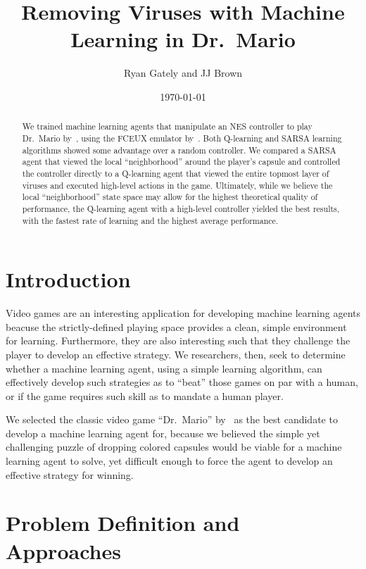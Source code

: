 \documentclass[letterpaper]{article} %
\author{Ryan Gately and JJ Brown}
\date{\today}
\title{Removing Viruses with Machine Learning in Dr.~Mario}
\begin{document}
\maketitle

\begin{abstract}
We trained machine learning agents that manipulate an NES controller to play Dr.~Mario by~\cite{drmario90}, using the FCEUX emulator by~\cite{fceux18}.
Both Q-learning and SARSA learning algorithms showed some advantage over a random controller.
We compared a SARSA agent that viewed the local ``neighborhood'' around the player's capsule and controlled the controller directly to a Q-learning agent that viewed the entire topmost layer of viruses and executed high-level actions in the game. Ultimately, while we believe the local ``neighborhood'' state space may allow for the highest theoretical quality of performance, the Q-learning agent with a high-level controller yielded the best results, with the fastest rate of learning and the highest average performance.
\end{abstract}

\section{Introduction}
Video games are an interesting application for developing machine learning agents beacuse the strictly-defined playing space provides a clean, simple environment for learning. Furthermore, they are also interesting such that they challenge the player to develop an effective strategy. We researchers, then, seek to determine whether a machine learning agent, using a simple learning algorithm, can effectively develop such strategies as to ``beat'' those games on par with a human, or if the game requires such skill as to mandate a human player.

We selected the classic video game ``Dr.~Mario'' by~\cite{drmario90} as the best candidate to develop a machine learning agent for, because we believed the simple yet challenging puzzle of dropping colored capsules would be viable for a machine learning agent to solve, yet difficult enough to force the agent to develop an effective strategy for winning.


\section{Problem Definition and Approaches}
\end{document}
